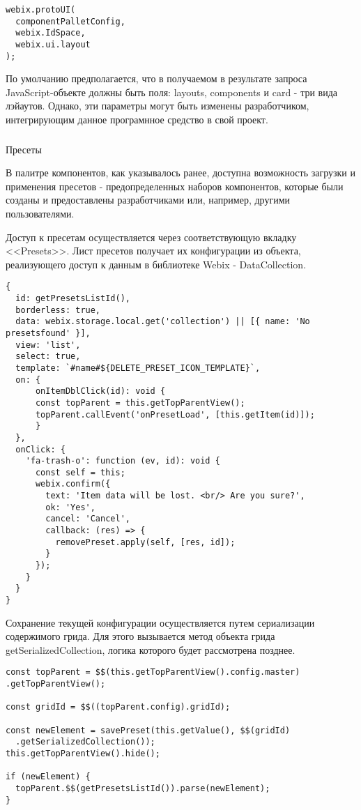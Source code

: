 \begin{lstlisting}
webix.protoUI(
  componentPalletConfig,
  webix.IdSpace,
  webix.ui.layout
);
\end{lstlisting}

По умолчанию предполагается, что в получаемом в результате запроса JavaScript-объекте должны быть поля: layouts, components и card - три вида лэйаутов. Однако, эти параметры могут быть изменены разработчиком, интегрирующим данное програмнное средство в свой проект.

\subsubsection{}Пресеты
\

В палитре компонентов, как указывалось ранее, доступна возможность загрузки и применения пресетов - предопределенных наборов компонентов, которые были созданы и предоставлены разработчиками или, например, другими пользователями.

Доступ к пресетам осуществляется через соответствующую вкладку <<Presets>>. Лист пресетов получает их конфигурации из объекта, реализующего доступ к данным в библиотеке Webix - DataCollection.

\begin{lstlisting}
{
  id: getPresetsListId(),
  borderless: true,
  data: webix.storage.local.get('collection') || [{ name: 'No presetsfound' }],
  view: 'list',
  select: true,
  template: `#name#${DELETE_PRESET_ICON_TEMPLATE}`,
  on: {
      onItemDblClick(id): void {
      const topParent = this.getTopParentView();
      topParent.callEvent('onPresetLoad', [this.getItem(id)]);
      }
  },
  onClick: {
    'fa-trash-o': function (ev, id): void {
      const self = this;
      webix.confirm({
        text: 'Item data will be lost. <br/> Are you sure?',
        ok: 'Yes',
        cancel: 'Cancel',
        callback: (res) => {
          removePreset.apply(self, [res, id]);
        }
      });
    }
  }
}
\end{lstlisting}

Сохранение текущей конфигурации осуществляется путем сериализации содержимого грида. Для этого вызывается метод объекта грида getSerializedCollection, логика которого будет рассмотрена позднее.

\begin{lstlisting}
const topParent = $$(this.getTopParentView().config.master)
.getTopParentView();

const gridId = $$((topParent.config).gridId);

const newElement = savePreset(this.getValue(), $$(gridId)
  .getSerializedCollection());
this.getTopParentView().hide();

if (newElement) {
  topParent.$$(getPresetsListId()).parse(newElement);
}
\end{lstlisting}

